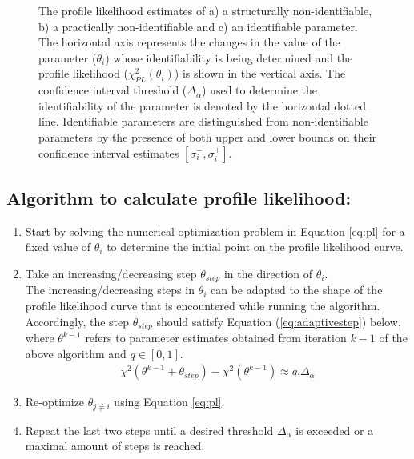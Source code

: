 \documentclass[10pt]{article}
\begin{document}
	\begin{figure}[!tbhp]
		\caption{The profile likelihood estimates of a) a structurally non-identifiable, b) a practically non-identifiable and c) an identifiable parameter. The horizontal axis represents the changes in the value of the parameter ($\theta_i$) whose identifiability is being determined and the profile likelihood ($\chi^2_{PL}(\theta_i)$) is shown in the vertical axis. The confidence interval threshold ($\Delta_{\alpha}$) used to determine the identifiability of the parameter is denoted by the horizontal dotted line. Identifiable parameters are distinguished from non-identifiable parameters by the presence of both upper and lower bounds on their confidence interval estimates $\left[\sigma_{i}^-,\sigma_{i}^+\right]$. }\label{fig:identtypes}
	\end{figure}
	
	\subsection{Algorithm to calculate profile likelihood:}		
	\begin{enumerate}
		\item Start by solving the numerical optimization problem in Equation \ref{eq:pl} for a fixed value of $\theta_i$ to determine the initial point on the profile likelihood curve.
		\item Take an increasing/decreasing step $\theta_{step}$ in the direction of $\theta_i$.\\
		The increasing/decreasing steps in $\theta_i$ can be adapted to the shape of the profile likelihood curve that is encountered while running the algorithm. Accordingly, the step $\theta_{step}$ should satisfy Equation (\ref{eq:adaptivestep}) below, where $\theta^{k-1}$ refers to parameter estimates obtained from iteration $k-1$ of the above algorithm and $q\in \left[0,1\right]$.
		\begin{align}\label{eq:adaptivestep}
		\chi^2\left(\theta^{k-1}+\theta_{step}\right) - \chi^2(\theta^{k-1}) \approx q.\Delta_{\alpha}
		\end{align}
		\item Re-optimize $\theta_{j\ne i}$ using Equation \ref{eq:pl}.
		\item Repeat the last two steps until a desired threshold $\Delta_{\alpha}$ is exceeded or a maximal amount of steps is reached.
	\end{enumerate}
	
\end{document}
